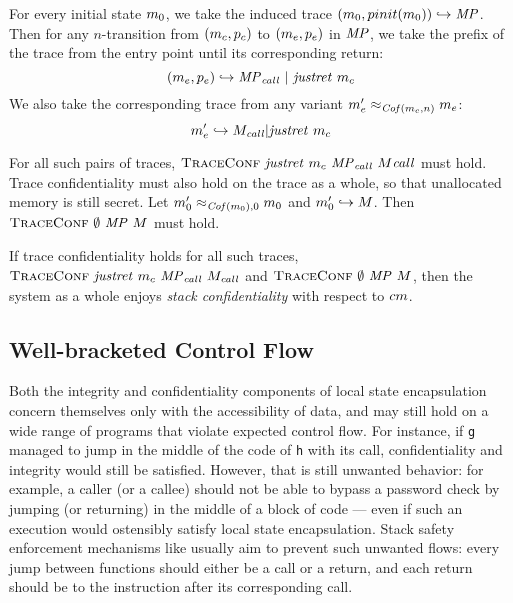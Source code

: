\documentclass[acmsmall,review,anonymous]{acmart}\settopmatter{printfolios=true,printccs=false,printacmref=false}
\begin{document}
For every initial state \(m_0\), we take the induced trace
\((m_0,pinit(m_0)) \hookrightarrow \mathit{MP}\). Then for
any \(n\)-transition from $(m_c,p_c)$ to
$(m_e,p_e)$ in $\mathit{MP}$, we take the prefix of the trace
from the entry point until its corresponding return:
%
\[(m_e,p_e) \hookrightarrow \mathit{MP}_{\mathit{call}} ~ | ~ \mathit{justret}\ m_c\]
%
We also take the corresponding trace from any variant \(m_e'
\approx_{\mathit{Cof}(m_c,n)} m_e\):
%
\[m_e' \hookrightarrow M_{\mathit{call}} | \mathit{justret}\ m_c\]

For all such pairs of traces, \(\text{\sc TraceConf} ~
\mathit{justret}\ m_c ~ \mathit{MP}_{\mathit{call}} ~ M{\mathit{call}}\) must hold.
Trace confidentiality must also hold on the trace as a whole, so that
unallocated memory is still secret. Let \(m_0'
\approx_{\mathit{Cof}(m_0),0} m_0\) and \(m_0' \hookrightarrow
M\). Then \(\text{\sc TraceConf} ~ \emptyset ~ \mathit{MP} ~ M\) must hold.

If trace confidentiality holds for all such traces,
\(\text{\sc TraceConf} ~ \mathit{justret}\ m_c ~ \mathit{MP}_{\mathit{call}} ~
M_{\mathit{call}}\) and
\(\text{\sc TraceConf} ~ \emptyset ~ \mathit{MP} ~ M\), then the
system as a whole enjoys {\em stack confidentiality} with respect to
\(cm\).

\subsection{Well-bracketed Control Flow}
\label{sec:wbcf}

Both the integrity and confidentiality components of local state
encapsulation concern themselves only with the accessibility of data,
and may still hold on a wide range of programs that violate expected
control flow. For instance, if {\tt g} managed to jump in the middle of
the code of {\tt h} with its call, confidentiality and integrity would
still be satisfied.
%
However, that is still unwanted behavior: for example, a caller (or a
callee) should not be able to bypass a password check by jumping (or
returning) in the middle of a block of code --- even if such an execution
would ostensibly satisfy local state encapsulation.
%
Stack safety enforcement mechanisms like \citet{Skorstengaard+19}
usually aim to prevent such unwanted flows: every jump between
functions should either be a call or a return, and each return should
be to the instruction after its corresponding call.
\end{document}
